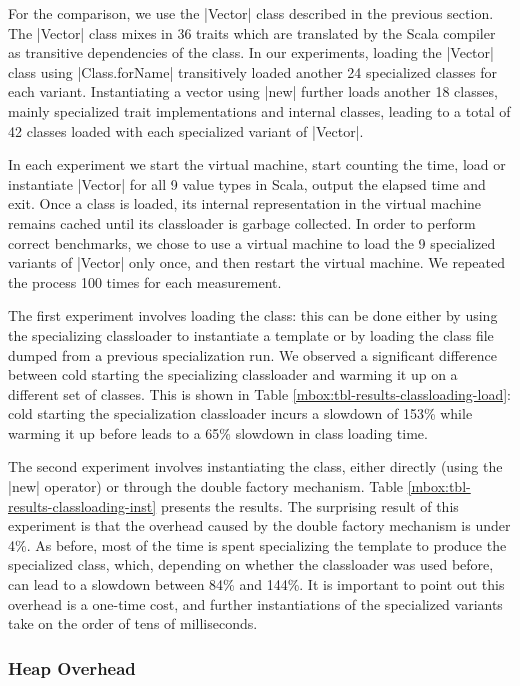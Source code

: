 For the comparison, we use the |Vector| class described in the previous section. The |Vector| class mixes in 36 traits \cite{scalable-component-abstractions} which are translated by the Scala compiler as transitive dependencies of the class. In our experiments, loading the |Vector| class using |Class.forName| transitively loaded another 24 specialized classes for each variant. Instantiating a vector using |new| further loads another 18 classes, mainly specialized trait implementations and internal classes, leading to a total of 42 classes loaded with each specialized variant of |Vector|. 

In each experiment we start the virtual machine, start counting the time, load or instantiate |Vector| for all 9 value types in Scala, output the elapsed time and exit. Once a class is loaded, its internal representation in the virtual machine remains cached until its classloader is garbage collected. In order to perform correct benchmarks, we chose to use a virtual machine to load the 9 specialized variants of |Vector| only once, and then restart the virtual machine. We repeated the process 100 times for each measurement. 

The first experiment involves loading the class: this can be done either by using the specializing classloader to instantiate a template or by loading the class file dumped from a previous specialization run. We observed a significant difference between cold starting the specializing classloader and warming it up on a different set of classes. This is shown in Table \ref{mbox:tbl-results-classloading-load}: cold starting the specialization classloader incurs a slowdown of 153\% while warming it up before leads to a 65\% slowdown in class loading time.   

The second experiment involves instantiating the class, either directly (using the |new| operator) or through the double factory mechanism. Table \ref{mbox:tbl-results-classloading-inst} presents the results. The surprising result of this experiment is that the overhead caused by the double factory mechanism is under 4\%. As before, most of the time is spent specializing the template to produce the specialized class, which, depending on whether the classloader was used before, can lead to a slowdown between 84\% and 144\%. It is important to point out this overhead is a one-time cost, and further instantiations of the specialized variants take on the order of tens of milliseconds. 

\subsubsection*{Heap Overhead}

